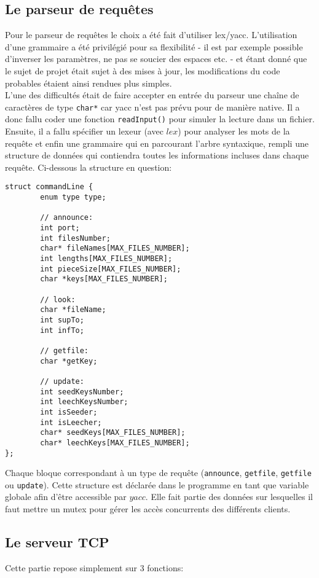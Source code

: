 \subsection{Le parseur de requêtes} 
Pour le parseur de requêtes le choix a été fait d'utiliser lex/yacc. L'utilisation d'une grammaire a été privilégié pour sa flexibilité - il est par exemple possible d'inverser les paramètres, ne pas se soucier des espaces etc. - et étant donné que le sujet de projet était sujet à des mises à jour, les modifications du code probables étaient ainsi rendues plus simples.\\ 
L'une des difficultés était de faire accepter en entrée du parseur une chaîne de caractères de type \texttt{char*} car yacc n'est pas prévu pour de manière native. Il a donc fallu coder une fonction \texttt{readInput()} pour simuler la lecture dans un fichier. Ensuite, il a fallu spécifier un lexeur (avec $lex$) pour analyser les mots de la requête et enfin une grammaire qui en parcourant l'arbre syntaxique, rempli une structure de données qui contiendra toutes les informations incluses dans chaque requête. Ci-dessous la structure en question: 
 
\begin{verbatim} 
struct commandLine { 
        enum type type; 
 
        // announce: 
        int port; 
        int filesNumber; 
        char* fileNames[MAX_FILES_NUMBER]; 
        int lengths[MAX_FILES_NUMBER]; 
        int pieceSize[MAX_FILES_NUMBER]; 
        char *keys[MAX_FILES_NUMBER]; 
 
        // look: 
        char *fileName; 
        int supTo; 
        int infTo; 
 
        // getfile: 
        char *getKey; 
 
        // update: 
        int seedKeysNumber; 
        int leechKeysNumber; 
        int isSeeder; 
        int isLeecher; 
        char* seedKeys[MAX_FILES_NUMBER]; 
        char* leechKeys[MAX_FILES_NUMBER]; 
}; 
\end{verbatim} 
 
Chaque bloque correspondant à un type de requête (\texttt{announce}, \texttt{getfile}, \texttt{getfile} ou \texttt{update}). 
Cette structure est déclarée dans le programme en tant que variable globale afin d'être accessible par $yacc$. Elle fait partie des données sur lesquelles il faut mettre un mutex pour gérer les accès concurrents des différents clients. 
 
\subsection{Le serveur TCP} 
Cette partie repose simplement sur 3 fonctions: 
 

